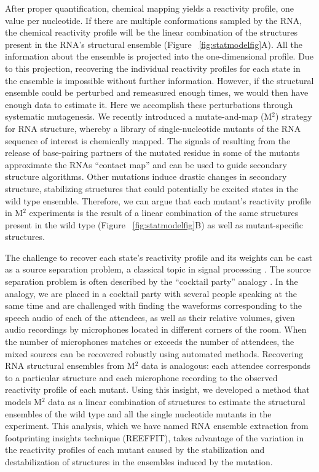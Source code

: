\documentclass[12pt]{article}
\begin{document}
After proper quantification, chemical mapping yields a reactivity profile, one value per nucleotide\cite{Mitra2008,Yoon2011}. 
If there are multiple conformations sampled by the RNA, the chemical reactivity profile will be the linear combination of the structures present in the RNA's structural ensemble (Figure ~\ref{fig:statmodelfig}A).
 All the information about the ensemble is projected into the one-dimensional profile. 
 Due to this projection, recovering the individual reactivity profiles for each state in the ensemble is impossible without further information. 
 However, if the structural ensemble could be perturbed and remeasured enough times, we would then have enough data to estimate it. 
 Here we accomplish these perturbations through systematic mutagenesis.
 We recently introduced a mutate-and-map (M$^2$) strategy for RNA structure, whereby a library of single-nucleotide mutants of the RNA sequence of interest is chemically mapped. 
 The signals of resulting from the release of base-pairing partners of the mutated residue in some of the mutants approximate the RNAs ``contact map'' and can be used to guide secondary structure algorithms.
 Other mutations induce drastic changes in secondary structure, stabilizing structures that could potentially be excited states in the wild type ensemble.
 Therefore, we can argue that each mutant's reactivity profile in M$^2$ experiments is the result of a linear combination of the same structures present in the wild type (Figure ~\ref{fig:statmodelfig}B) as well as mutant-specific structures. 
 
 The challenge to recover each state's reactivity profile and its weights can be cast as a source separation problem, a classical topic in signal processing \cite{Attias1999,Cardoso1998}. 
 The source separation problem is often described by the ``cocktail party'' analogy \cite{Cardoso1998}. 
 In the analogy, we are placed in a cocktail party with several people speaking at the same time and are challenged with finding the waveforms corresponding to the speech audio of each of the attendees, as well as their relative volumes, given audio recordings by microphones located in different corners of the room. 
 When the number of microphones matches or exceeds the number of attendees, the mixed sources can be recovered robustly using automated methods. 
 Recovering RNA structural ensembles from M$^2$ data is analogous: each attendee corresponds to a particular structure and each microphone recording to the observed reactivity profile of each mutant. 
 Using this insight, we developed a method that models M$^2$ data as a linear combination of structures to estimate the structural ensembles of the wild type and all the single nucleotide mutants in the experiment. 
 This analysis, which we have named RNA ensemble extraction from footprinting insights technique (REEFFIT), takes advantage of the variation in the reactivity profiles of each mutant caused by the stabilization and destabilization of structures in the ensembles induced by the mutation. 
\end{document}
